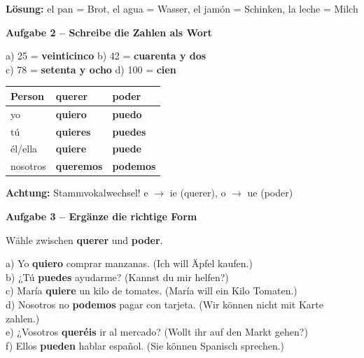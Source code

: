 \documentclass[11pt, a4paper]{article}
\newcommand{\fachfarbe}{spanisch}
\newcommand{\punktebox}[1]{\hfill\fbox{\small \_/#1}}
\newcommand{\lsg}[1]{\textcolor{loesung}{\textbf{#1}}}
\newenvironment{aufgabe}[1]{%
    \needspace{5\baselineskip}%
    \nopagebreak[4]%
    \vspace{10pt}
    \noindent\textbf{\textcolor{\fachfarbe}{Aufgabe #1}}
    \nopagebreak[4]%
    \vspace{5pt}
    \nopagebreak[4]%
    \begin{list}{}{\leftmargin=0pt}
    \item[]
}{%
    \end{list}
}
\newcommand{\es}[1]{\textcolor{\fachfarbe}{\textbf{#1}}}
\begin{document}
\textbf{Lösung:} el pan = Brot, el agua = Wasser, el jamón = Schinken, la leche = Milch

\vspace{10pt}

\begin{aufgabe}{2 -- Schreibe die Zahlen als Wort}
\punktebox{4}
\end{aufgabe}

\noindent
a) 25 = \lsg{veinticinco} \hfill
b) 42 = \lsg{cuarenta y dos} \\[0.8em]
c) 78 = \lsg{setenta y ocho} \hfill
d) 100 = \lsg{cien} \\

\vspace{15pt}

\begin{merkkasten}

\begin{tabular}{|l|l|l|}
\hline
\textbf{Person} & \textbf{querer} & \textbf{poder} \\
\hline
yo & \lsg{quiero} & \lsg{puedo} \\
\hline
tú & \lsg{quieres} & \lsg{puedes} \\
\hline
él/ella & \lsg{quiere} & \lsg{puede} \\
\hline
nosotros & \lsg{queremos} & \lsg{podemos} \\
\hline
\end{tabular}

\vspace{0.5em}
\textbf{Achtung:} Stammvokalwechsel! e $\rightarrow$ ie (querer), o $\rightarrow$ ue (poder)
\end{merkkasten}

\vspace{10pt}

\begin{aufgabe}{3 -- Ergänze die richtige Form}
Wähle zwischen \es{querer} und \es{poder}. \punktebox{6}
\end{aufgabe}

\noindent
a) Yo \lsg{quiero} comprar manzanas. (Ich will Äpfel kaufen.) \\[0.8em]
b) ¿Tú \lsg{puedes} ayudarme? (Kannst du mir helfen?) \\[0.8em]
c) María \lsg{quiere} un kilo de tomates. (María will ein Kilo Tomaten.) \\[0.8em]
d) Nosotros no \lsg{podemos} pagar con tarjeta. (Wir können nicht mit Karte zahlen.) \\[0.8em]
e) ¿Vosotros \lsg{queréis} ir al mercado? (Wollt ihr auf den Markt gehen?) \\[0.8em]
f) Ellos \lsg{pueden} hablar español. (Sie können Spanisch sprechen.) \\
\end{document}
